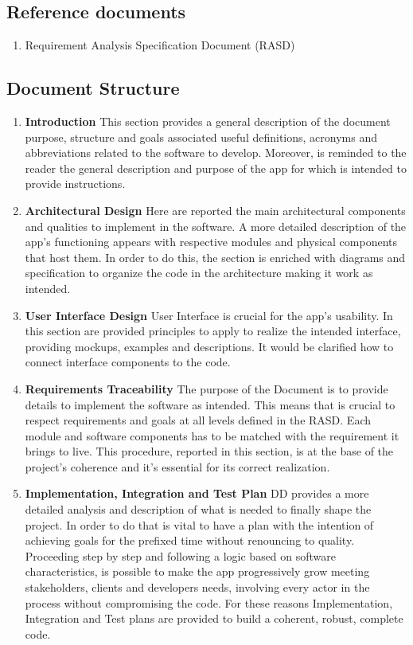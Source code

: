 \subsection{Reference documents}
\begin{enumerate}[label=$\bullet$]
    \item Requirement Analysis Specification Document (RASD)
\end{enumerate}
\subsection{Document Structure}
\begin{enumerate}
    \item \textbf{Introduction} This section provides a general description of the document purpose, structure and goals associated useful definitions, acronyms and abbreviations related to the software to develop. Moreover, is reminded to the reader the general description and purpose of the app for which is intended to provide instructions.
    \item \textbf{Architectural Design} Here are reported the main architectural components and qualities to implement in the software. A more detailed description of the app's functioning appears with respective modules and physical components that host them. In order to do this, the section is enriched with diagrams and specification to organize the code in the architecture making it work as intended.
    \item \textbf{User Interface Design} User Interface is crucial for the app's usability. In this section are provided principles to apply to realize the intended interface, providing mockups, examples and descriptions. It would be clarified how to connect interface components to the code.
    \item \textbf{Requirements Traceability} The purpose of the Document is to provide details to implement the software as intended. This means that is crucial to respect requirements and goals at all levels defined in the RASD. Each module and software components has to be matched with the requirement it brings to live. This procedure, reported in this section, is at the base of the project's coherence and it's essential for its correct realization.
    \item \textbf{Implementation, Integration and Test Plan} DD provides a more detailed analysis and description of what is needed to finally shape the project. In order to do that is vital to have a plan with the intention of achieving goals for the prefixed time without renouncing to quality. Proceeding step by step and following a logic based on software characteristics, is possible to make the app progressively grow meeting stakeholders, clients and developers needs, involving every actor in the process without compromising the code. For these reasons Implementation, Integration and Test plans are provided to build a coherent, robust, complete code.
\end{enumerate}